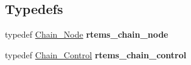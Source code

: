 \subsection*{Typedefs}
\begin{DoxyCompactItemize}
\item 
\mbox{\label{group__ClassicChains_ga2be673722e884e9462d7659ccfb04d04}} 
typedef \mbox{\hyperlink{group__RTEMSScoreChain_ga0dd4bfcca1ac7f90de2842e447846d3d}{Chain\+\_\+\+Node}} {\bfseries rtems\+\_\+chain\+\_\+node}
\item 
\mbox{\label{group__ClassicChains_ga15a7855d266217500b6f4bb246f74bcc}} 
typedef \mbox{\hyperlink{unionChain__Control}{Chain\+\_\+\+Control}} {\bfseries rtems\+\_\+chain\+\_\+control}
\end{DoxyCompactItemize}
